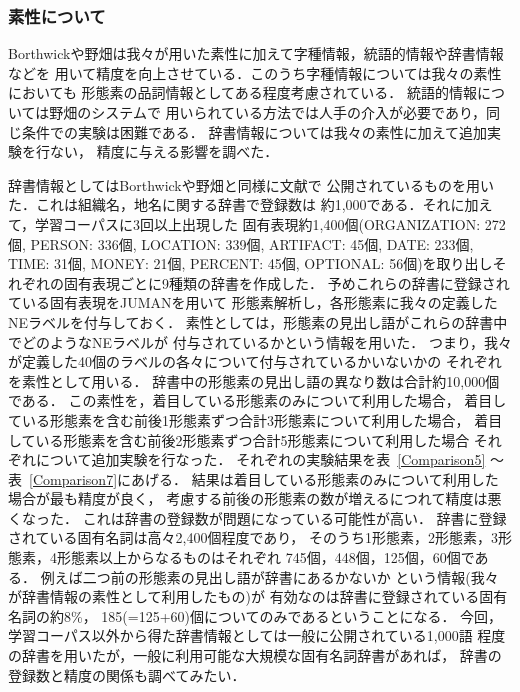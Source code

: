 \subsubsection{素性について}
\label{sec:feature}

Borthwickや野畑は我々が用いた素性に加えて字種情報，統語的情報や辞書情報などを
用いて精度を向上させている．このうち字種情報については我々の素性においても
形態素の品詞情報としてある程度考慮されている．
統語的情報については野畑のシステムで
用いられている方法では人手の介入が必要であり，同じ条件での実験は困難である．
辞書情報については我々の素性に加えて追加実験を行ない，
精度に与える影響を調べた．

辞書情報としてはBorthwickや野畑と同様に文献\cite{sekine:homepage}で
公開されているものを用いた．これは組織名，地名に関する辞書で登録数は
約1,000である．それに加えて，学習コーパスに3回以上出現した
固有表現約1,400個(ORGANIZATION: 272個, PERSON: 336個, LOCATION: 339個, 
ARTIFACT: 45個, DATE: 233個, TIME: 31個, MONEY: 21個, PERCENT: 45個, 
OPTIONAL: 56個)を取り出しそれぞれの固有表現ごとに9種類の辞書を作成した．
予めこれらの辞書に登録されている固有表現をJUMANを用いて
形態素解析し，各形態素に我々の定義したNEラベルを付与しておく．
素性としては，形態素の見出し語がこれらの辞書中でどのようなNEラベルが
付与されているかという情報を用いた．
つまり，我々が定義した40個のラベルの各々について付与されているかいないかの
それぞれを素性として用いる．
辞書中の形態素の見出し語の異なり数は合計約10,000個である．
この素性を，着目している形態素のみについて利用した場合，
着目している形態素を含む前後1形態素ずつ合計3形態素について利用した場合，
着目している形態素を含む前後2形態素ずつ合計5形態素について利用した場合
それぞれについて追加実験を行なった．
それぞれの実験結果を表~\ref{Comparison5} 〜表~\ref{Comparison7}にあげる．
結果は着目している形態素のみについて利用した場合が最も精度が良く，
考慮する前後の形態素の数が増えるにつれて精度は悪くなった．
これは辞書の登録数が問題になっている可能性が高い．
辞書に登録されている固有名詞は高々2,400個程度であり，
そのうち1形態素，2形態素，3形態素，4形態素以上からなるものはそれぞれ
745個，448個，125個，60個である．
例えば二つ前の形態素の見出し語が辞書にあるかないか
という情報(我々が辞書情報の素性として利用したもの)が
有効なのは辞書に登録されている固有名詞の約8\%，
185(=125+60)個についてのみであるということになる．
今回，学習コーパス以外から得た辞書情報としては一般に公開されている1,000語
程度の辞書を用いたが，一般に利用可能な大規模な固有名詞辞書があれば，
辞書の登録数と精度の関係も調べてみたい．

